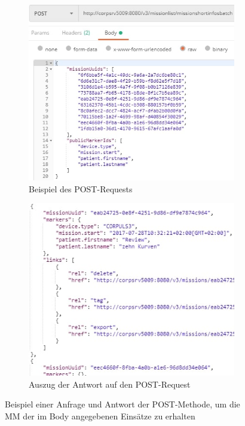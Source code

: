 \begin{figure}[ht]
\begin{subfigure}{.5\linewidth}
  \centering
  \includegraphics[width=.95\linewidth]{img/exRequestW}  
  \caption{Beispiel des POST-Requests}
  \label{fig:request}
\end{subfigure}
\begin{subfigure}{.5\linewidth}
  \centering
  \includegraphics[width=.95\linewidth]{img/exResponseW}  
  \caption{Auszug der Antwort auf den POST-Request}
  \label{fig:response}
\end{subfigure}
\caption[Beispiel einer Anfrage und Antwort der POST-Methode]{Beispiel einer Anfrage und Antwort der POST-Methode, um die \gls{MM} der im Body angegebenen Einsätze zu erhalten}
\label{fig:fig}
\end{figure}

